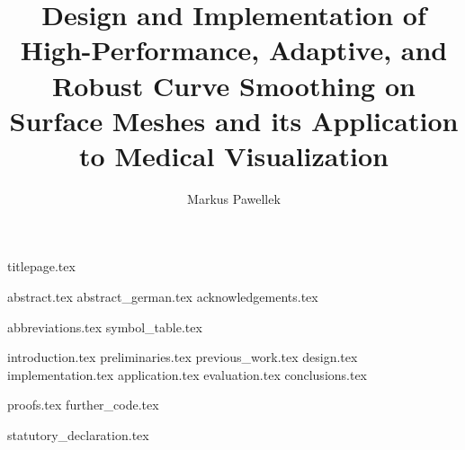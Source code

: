\documentclass[fleqn,10pt,twoside]{stdglobal}
\title{Design and Implementation of High-Performance, Adaptive, and Robust Curve Smoothing on Surface Meshes and its Application to Medical Visualization}
\author{Markus Pawellek}
\let\oldpagenumbering\pagenumbering
\renewcommand*\pagenumbering[1]{\cleardoublepage\oldpagenumbering{#1}}
\begin{document}

  {titlepage.tex}

  {abstract.tex}
  \cleardoublepage
  {abstract_german.tex}
  {acknowledgements.tex}

  \tableofcontents
  \listoffigures
  \listoftables
  \listofmath
  {
    \small
    \listofcode
  }
  {abbreviations.tex}
  {symbol_table.tex}

  {introduction.tex}
  {preliminaries.tex}
  {previous_work.tex}
  {design.tex}
  {implementation.tex}
  {application.tex}
  {evaluation.tex}
  {conclusions.tex}

  \nocite{*}
  \printbibheading[heading=bibintoc]
  \printbibliography[heading=subbibliography,title={Books},type=book]
  \printbibliography[heading=subbibliography,title={Online},type=online]
  \printbibliography[heading=subbibliography,title={Articles},nottype=book,nottype=online]

  \appendix
  {proofs.tex}
  {further_code.tex}

  {statutory_declaration.tex}
\end{document}
